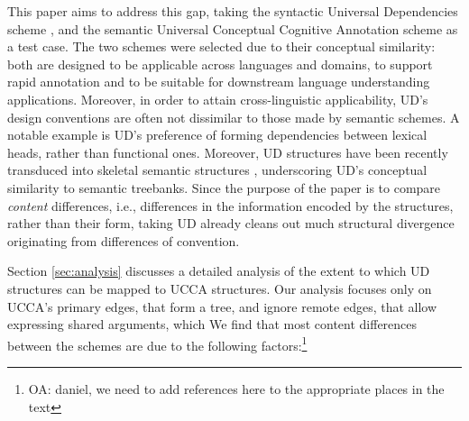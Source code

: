 \documentclass[11pt,a4paper]{article}
\newcommand{\oa}[1]{\footnote{\color{red}OA: #1}}
\begin{document}
  This paper aims to address this gap, taking the syntactic Universal Dependencies scheme
  ,
  and the semantic Universal Conceptual Cognitive Annotation \cite[UCCA; ][]{abend2013universal} scheme
  as a test case. The two schemes were selected due to their conceptual similarity: 
  both are designed to be applicable across languages and domains, 
  to support rapid annotation and to be suitable for downstream language understanding applications.
  Moreover, in order to attain cross-linguistic applicability, UD's design conventions are 
  often not dissimilar to those made by semantic schemes. A notable example is UD's preference
  of forming dependencies between lexical heads, rather than functional ones.
  Moreover, UD structures have been recently transduced into skeletal semantic 
  structures \cite[e.g.,][]{reddy2016,predpatt}, underscoring UD's conceptual similarity to semantic treebanks.
  Since the purpose of the paper is to compare {\it content} differences, i.e., differences in the information
  encoded by the structures, rather than their form, taking UD already cleans out much structural divergence
  originating from differences of convention.
  
  Section \ref{sec:analysis} discusses a detailed analysis of the extent to which UD structures can be mapped
  to UCCA structures. Our analysis focuses only on UCCA's primary edges, that form a tree, and ignore remote
	edges, that allow expressing shared arguments, which 
	We find that most content differences between the schemes are due to the following factors:\oa{daniel, we need
	to add references here to the appropriate places in the text}
  
\end{document}
